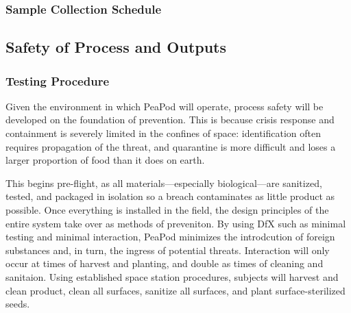 
\subsubsection{Sample Collection Schedule}




\clearpage

\subsection{Safety of Process and Outputs}


\subsubsection{Testing Procedure}

Given the environment in which PeaPod will operate, process safety will be developed on the foundation of prevention. This is because crisis response and containment is severely limited in the confines of space: identification often requires propagation of the threat, and quarantine is more difficult and loses a larger proportion of food than it does on earth.

This begins pre-flight, as all materials---especially biological---are sanitized, tested, and packaged in isolation so a breach contaminates as little product as possible. Once everything is installed in the field, the design principles of the entire system take over as methods of preveniton. By using DfX such as minimal testing and minimal interaction, PeaPod minimizes the introdcution of foreign substances and, in turn, the ingress of potential threats. Interaction will only occur at times of harvest and planting, and double as times of cleaning and sanitaion. Using established space station procedures, subjects will harvest and clean product, clean all surfaces, sanitize all surfaces, and plant surface-sterilized seeds.

